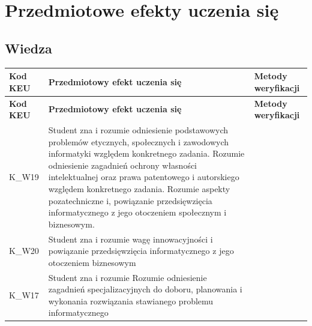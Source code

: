 \documentclass[12pt, a4paper]{article}
\newcommand{\thdrule}{\noalign{\global\setlength{\extrarowheight}{0pt}}}
\newcommand{\thdend}{\noalign{\global\setlength{\extrarowheight}{3pt}}}
\begin{document}
\section{Przedmiotowe efekty uczenia się}

\subsection*{Wiedza}
{\scriptsize
\begin{longtable}{m{1.6cm}m{9.0cm}m{4.2cm}}
\thdrule\toprule
\rowcolor{pjatkRed} {\color{white}\footnotesize\textbf{\vphantom{Ag}Kod KEU}} & {\color{white}\footnotesize\textbf{\vphantom{Ag}Przedmiotowy efekt uczenia się}} & {\color{white}\footnotesize\textbf{\vphantom{Ag}Metody weryfikacji}} \\
\midrule\thdend
\endfirsthead
\thdrule\toprule
\rowcolor{pjatkRed} {\color{white}\footnotesize\textbf{\vphantom{Ag}Kod KEU}} & {\color{white}\footnotesize\textbf{\vphantom{Ag}Przedmiotowy efekt uczenia się}} & {\color{white}\footnotesize\textbf{\vphantom{Ag}Metody weryfikacji}} \\
\midrule\thdend
\endhead
  \rowcolor{tableRowLight} K\_W19 & Student zna i rozumie  odniesienie podstawowych problemów etycznych, społecznych i zawodowych informatyki względem konkretnego zadania.  Rozumie odniesienie zagadnień ochrony własności intelektualnej oraz prawa patentowego i autorskiego względem konkretnego zadania.  Rozumie aspekty pozatechniczne i, powiązanie przedsięwzięcia informatycznego z jego  otoczeniem społecznym i biznesowym. &  \\
  \rowcolor{tableRowAlt} K\_W20 & Student zna i rozumie  wagę innowacyjności i powiązanie przedsięwzięcia informatycznego z jego otoczeniem biznesowym &  \\
  \rowcolor{tableRowLight} K\_W17 & Student zna i rozumie  Rozumie odniesienie zagadnień specjalizacyjnych do doboru, planowania i wykonania rozwiązania stawianego problemu informatycznego &  \\
\bottomrule
\end{longtable}}
\end{document}
